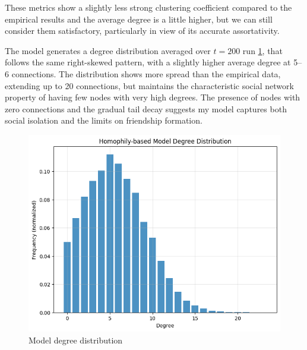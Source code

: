\documentclass[runningheads]{llncs}
\begin{document}
These metrics show a slightly less strong clustering coefficient compared to the empirical results and the average degree is a little higher, but we can still consider them satisfactory, particularly in view of its accurate assortativity.

The  model generates a degree distribution averaged over $t = 200$ run \ref{fig:model_degree_distribution}, that follows the same right-skewed pattern, with a slightly higher average degree at 5–6 connections. The distribution shows more spread than the empirical data, extending up to 20 connections, but maintains the characteristic social network property of having few nodes with very high degrees. The presence of nodes with zero connections and the gradual tail decay suggests my model captures both social isolation and the limits on friendship formation.


\begin{figure}[h]
    \centering
    \includegraphics[width=0.9\linewidth]{output_degree.png}
    \caption{Model degree distribution}
    \label{fig:model_degree_distribution}
\end{figure}
\end{document}
